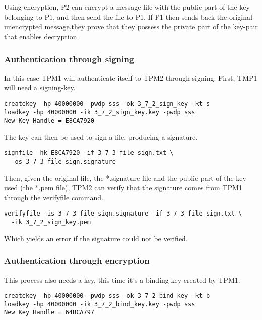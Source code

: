 \documentclass[10pt]{article}
\begin{document}
    Using encryption, P2 can encrypt a message-file with the public part of the
    key belonging to P1, and then send the file to P1. If P1 then sends back
    the original unencrypted message,they prove that they possess the private
    part of the key-pair that enables decryption.

    \subsubsection{Authentication through signing}

      In this case TPM1 will authenticate itself to TPM2 through signing.
      First, TMP1 will need a signing-key.

\begin{verbatim}
createkey -hp 40000000 -pwdp sss -ok 3_7_2_sign_key -kt s
loadkey -hp 40000000 -ik 3_7_2_sign_key.key -pwdp sss
New Key Handle = E8CA7920
\end{verbatim}

      The key can then be used to sign a file, producing a signature.

\begin{verbatim}
signfile -hk E8CA7920 -if 3_7_3_file_sign.txt \
  -os 3_7_3_file_sign.signature
\end{verbatim}

      Then, given the original file, the *.signature file and the public part of
      the key used (the *.pem file), TPM2 can verify that the signature comes from
      TPM1 through the verifyfile command.

\begin{verbatim}
verifyfile -is 3_7_3_file_sign.signature -if 3_7_3_file_sign.txt \
  -ik 3_7_2_sign_key.pem
\end{verbatim}

      Which yields an error if the signature could not be verified.

    \subsubsection{Authentication through encryption}

      This process also needs a key, this time it's a binding key created by
      TPM1.

\begin{verbatim}
createkey -hp 40000000 -pwdp sss -ok 3_7_2_bind_key -kt b
loadkey -hp 40000000 -ik 3_7_2_bind_key.key -pwdp sss
New Key Handle = 64BCA797
\end{verbatim}
\end{document}
